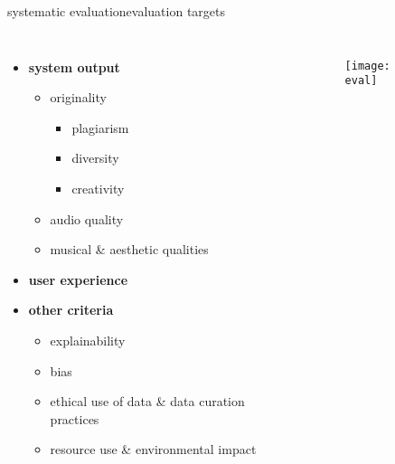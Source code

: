\begin{frame}{systematic evaluation}{evaluation targets}
    \vspace{-7mm}
    \begin{columns}
        \begin{itemize}
            \item \textbf{system output}
                \begin{itemize}
                    \item   originality
                        \begin{itemize}
                            \item plagiarism
                            \item   diversity
                            \item creativity
                        \end{itemize}
                    \item   audio quality
                    \item   musical \& aesthetic qualities
                \end{itemize}
            \smallskip
            \item \textbf{user experience}
            \smallskip
            \item   \textbf{other criteria}
                \begin{itemize}
                    \item explainability
                    \item bias
                    \item   ethical use of data \& data curation practices
                    \item   resource use \& environmental impact
                \end{itemize}
        \end{itemize}
        \begin{figure}%
            \texttt{[image: eval]}%
        \end{figure}
    \end{columns}
\end{frame}

